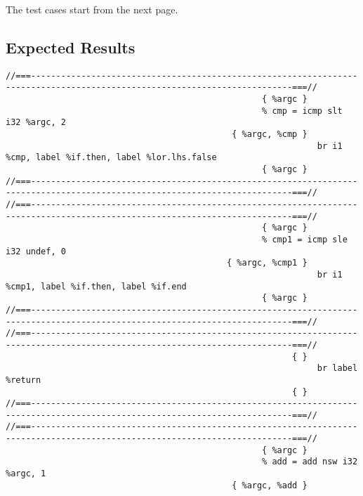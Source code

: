 The test cases start from the next page.



\subsection{Expected Results}

\begingroup
\fontsize{6pt}{8pt}\selectfont
\begin{verbatim}
//===--------------------------------------------------------------------------------------------------------------------------===//
                                                   { %argc }
                                                   % cmp = icmp slt i32 %argc, 2
                                             { %argc, %cmp }
                                                              br i1 %cmp, label %if.then, label %lor.lhs.false
                                                   { %argc }
//===--------------------------------------------------------------------------------------------------------------------------===//
//===--------------------------------------------------------------------------------------------------------------------------===//
                                                   { %argc }
                                                   % cmp1 = icmp sle i32 undef, 0
                                            { %argc, %cmp1 }
                                                              br i1 %cmp1, label %if.then, label %if.end
                                                   { %argc }
//===--------------------------------------------------------------------------------------------------------------------------===//
//===--------------------------------------------------------------------------------------------------------------------------===//
                                                         { }
                                                              br label %return
                                                         { }
//===--------------------------------------------------------------------------------------------------------------------------===//
//===--------------------------------------------------------------------------------------------------------------------------===//
                                                   { %argc }
                                                   % add = add nsw i32 %argc, 1
                                             { %argc, %add }

\end{verbatim}
